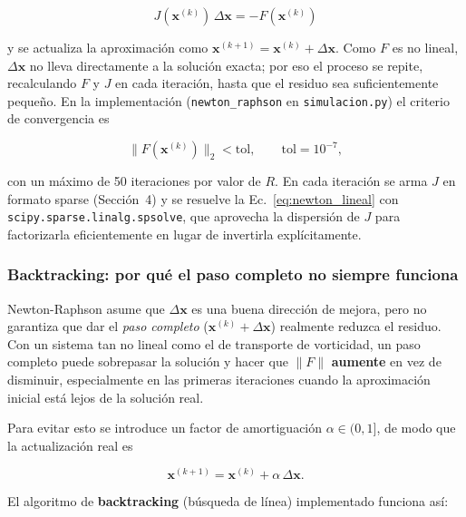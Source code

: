 \documentclass[12pt, a4paper]{article}
\begin{document}
\begin{ecbox}
  \begin{equation}
    J(\mathbf{x}^{(k)})\,\Delta\mathbf{x} = -F(\mathbf{x}^{(k)})
    \label{eq:newton_lineal}
  \end{equation}
\end{ecbox}

y se actualiza la aproximación como $\mathbf{x}^{(k+1)} = \mathbf{x}^{(k)} +
\Delta\mathbf{x}$. Como $F$ es no lineal, $\Delta\mathbf{x}$ no lleva
directamente a la solución exacta; por eso el proceso se repite, recalculando
$F$ y $J$ en cada iteración, hasta que el residuo sea suficientemente pequeño.
En la implementación (\texttt{newton\_raphson} en \texttt{simulacion.py}) el
criterio de convergencia es

\begin{equation}
  \|F(\mathbf{x}^{(k)})\|_2 < \text{tol}, \qquad \text{tol} = 10^{-7},
\end{equation}

con un máximo de 50 iteraciones por valor de $R$. En cada iteración se arma
$J$ en formato sparse (Sección~4) y se resuelve la Ec.~\eqref{eq:newton_lineal}
con \texttt{scipy.sparse.linalg.spsolve}, que aprovecha la dispersión de $J$
para factorizarla eficientemente en lugar de invertirla explícitamente.

\subsubsection{Backtracking: por qué el paso completo no siempre funciona}

Newton-Raphson asume que $\Delta\mathbf{x}$ es una buena dirección de mejora,
pero no garantiza que dar el \emph{paso completo} ($\mathbf{x}^{(k)} +
\Delta\mathbf{x}$) realmente reduzca el residuo. Con un sistema tan no lineal
como el de transporte de vorticidad, un paso completo puede sobrepasar la
solución y hacer que $\|F\|$ \textbf{aumente} en vez de disminuir, especialmente
en las primeras iteraciones cuando la aproximación inicial está lejos de la
solución real.

Para evitar esto se introduce un factor de amortiguación $\alpha \in (0,1]$,
de modo que la actualización real es

\begin{equation}
  \mathbf{x}^{(k+1)} = \mathbf{x}^{(k)} + \alpha\,\Delta\mathbf{x}.
\end{equation}

El algoritmo de \textbf{backtracking} (búsqueda de línea) implementado
funciona así:
\end{document}
